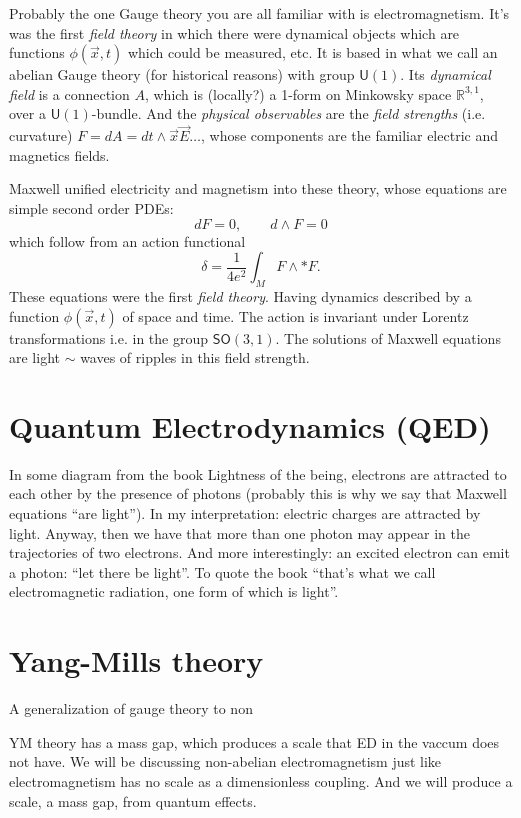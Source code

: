 \documentclass{book}
\begin{document}
{Probably the one Gauge theory you are all
familiar with is electromagnetism.
It's was the first \textit{field theory} in
which there were dynamical objects
which are functions $\phi(\vec{x},t)$ which
could be measured, etc. It is based
in what we call an abelian Gauge theory (for
historical reasons) with group
$\mathsf{U}(1)$. Its \textit{dynamical field}
is a connection $A$, which is
(locally?) a 1-form on Minkowsky space
$\mathbb{R}^{3,1}$, over a
$\mathsf{U}(1)$-bundle. And the
\textit{physical observables} are the
\textit{field strengths} (i.e. curvature)
$F=dA=dt\wedge \vec{x}
\vec{E}\ldots$, whose components are the
familiar electric and
magnetics fields.

Maxwell unified electricity and magnetism
into these theory, whose equations are
simple second order PDEs:
\[dF=0,\qquad d\wedge F=0\]
which follow from an action functional
\[\delta=\frac{1}{4e^2}\int_{M}F\wedge * F.\]
These equations were the first \textit{field
theory}. Having dynamics described
by a function $\phi(\vec{x},t)$ of space and
time. The action is invariant under
Lorentz transformations i.e. in the group
$\mathsf{SO}(3,1)$. The solutions of
Maxwell equations are light $\sim$ waves of
ripples in this field strength.

\section{Quantum Electrodynamics (QED)}
\label{section-QED}

In some diagram from the book Lightness of
the being, electrons are attracted to
each other by the presence of photons
(probably this is why we say that Maxwell
equations ``are light''). In my
interpretation: electric charges are
attracted
by light. Anyway, then we have that more than
one photon may appear in the
trajectories of two electrons. And more
interestingly: an excited electron can
emit a photon: ``let there be light''. To
quote the book ``that's what we call
electromagnetic radiation, one form of which
is light''.

\section{Yang-Mills theory}
\label{section-Yang-Mills-theory}

A generalization of gauge theory to non

YM theory has a mass gap, which produces a
scale that ED in the vaccum does not
have. We will be discussing non-abelian
electromagnetism just like
electromagnetism has no scale as a
dimensionless coupling. And we will produce a
scale, a mass gap, from quantum effects.

}
\end{document}
